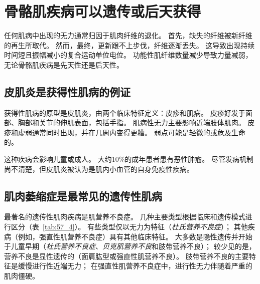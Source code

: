 \section{骨骼肌疾病可以遗传或后天获得}

任何肌病中出现的无力通常归因于肌肉纤维的退化。
首先，缺失的纤维被新纤维的再生所取代。
然而，最终，更新跟不上步伐，纤维逐渐丢失。
这导致出现持续时间短且振幅减小的复合运动单位电位。
功能性肌纤维数量减少导致力量减弱，无论骨骼肌疾病是先天性还是后天性。



\subsection{皮肌炎是获得性肌病的例证}

获得性肌病的原型是皮肌炎，由两个临床特征定义：皮疹和肌病。
皮疹好发于面部、胸部和关节的伸肌表面，包括手指。
肌病性无力主要影响近端肢体肌肉。
皮疹和虚弱通常同时出现，并在几周内变得更糟。
弱点可能是轻微的或危及生命的。


这种疾病会影响儿童或成人。
大约10\%的成年患者患有恶性肿瘤。
尽管发病机制尚不清楚，但皮肌炎被认为是肌内小血管的自身免疫性疾病。



\subsection{肌肉萎缩症是最常见的遗传性肌病}

最著名的遗传性肌肉疾病是肌营养不良症。
几种主要类型根据临床和遗传模式进行区分（表~\ref{tab:57_4}）。
有些类型仅以无力为特征（\textit{杜氏营养不良症}）；
其他疾病（例如，强直性肌营养不良症）具有其他临床特征。
大多数是隐性遗传并开始于儿童早期（\textit{杜氏营养不良症}、\textit{贝克肌营养不良}和肢带营养不良）；
较少见的是，营养不良是显性遗传的（面肩肱型或强直性肌营养不良）。
肢带营养不良的主要特征是缓慢进行性近端无力；
在强直性肌营养不良症中，进行性无力伴随着严重的肌肉僵硬。


